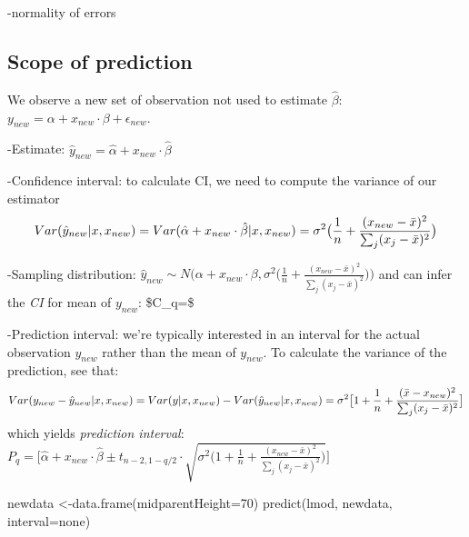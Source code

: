 \documentclass[
]{article}
\newenvironment{Shaded}{\begin{snugshade}}{\end{snugshade}}
\newcommand{\AttributeTok}[1]{\textcolor[rgb]{0.77,0.63,0.00}{#1}}
\newcommand{\DecValTok}[1]{\textcolor[rgb]{0.00,0.00,0.81}{#1}}
\newcommand{\FunctionTok}[1]{\textcolor[rgb]{0.00,0.00,0.00}{#1}}
\newcommand{\NormalTok}[1]{#1}
\newcommand{\OtherTok}[1]{\textcolor[rgb]{0.56,0.35,0.01}{#1}}
\newcommand{\StringTok}[1]{\textcolor[rgb]{0.31,0.60,0.02}{#1}}
\begin{document}
-normality of errors

\hypertarget{scope-of-prediction}{%
\subsection{Scope of prediction}\label{scope-of-prediction}}

We observe a new set of observation not used to estimate
\(\hat{\beta}\): \(y_{new}=\alpha+x_{new}\cdot\beta+\epsilon_{new}\).

-Estimate: \(\hat{y}_{new}=\hat{\alpha}+x_{new}\cdot\hat{\beta}\)

-Confidence interval: to calculate CI, we need to compute the variance
of our estimator
\[Var(\hat{y}_{new}|x, x_{new})=Var(\hat{\alpha}+ x_{new}\cdot\hat{\beta}|x,x_{new})\\
=\sigma^2\big(\frac{1}{n}+\frac{(x_{new}-\bar{x})^2}{\sum_j (x_j-\bar{x})^2}\big)\]

-Sampling distribution:
\(\hat{y}_{new}\sim N\big(\alpha+x_{new}\cdot\beta,\sigma^2\big(\frac{1}{n}+\frac{(x_{new}-\bar{x})^2}{\sum_j (x_j-\bar{x})^2}\big)\big)\)
and can infer the \emph{CI} for mean of \(y_{new}\):
\$C\_q= \$

-Prediction interval: we're typically interested in an interval for the
actual observation \(y_{new}\) rather than the mean of \(y_{new}\). To
calculate the variance of the prediction, see that:
\[Var(y_{new}-\hat{y}_{new}|x, x_{new})=Var(y|x, x_{new})-Var(\hat{y}_{new}|x, x_{new})\\
=\sigma^2\big[ 1+\frac{1}{n}+\frac{(\bar{x}-x_{new})^2}{\sum_j (x_j-\bar{x})^2}\big]\]
which yields \emph{prediction interval}:
\(P_q=\big[\hat{\alpha}+ x_{new}\cdot\hat{\beta}\pm t_{n-2, 1-q/2}\cdot\sqrt{\sigma^2\big(1+\frac{1}{n}+\frac{(x_{new}-\bar{x})^2}{\sum_j (x_j-\bar{x})^2}\big)}\big]\)

\begin{Shaded}
\begin{Highlighting}[]
\NormalTok{newdata }\OtherTok{\textless{}{-}}\FunctionTok{data.frame}\NormalTok{(}\AttributeTok{midparentHeight=}\DecValTok{70}\NormalTok{)}
\FunctionTok{predict}\NormalTok{(lmod, newdata, }\AttributeTok{interval=}\StringTok{\textquotesingle{}none\textquotesingle{}}\NormalTok{)}
\end{Highlighting}
\end{Shaded}
\end{document}
